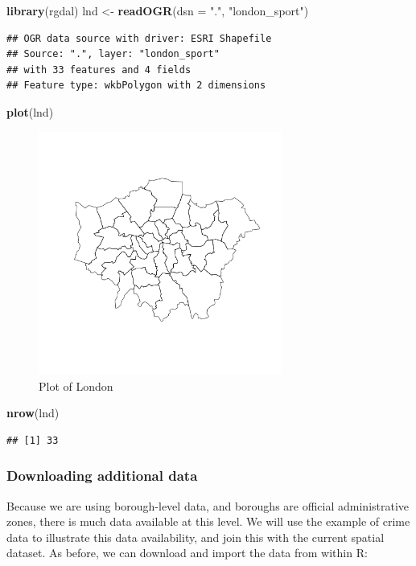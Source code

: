 \documentclass[]{article}
\newenvironment{Shaded}{}{}
\newcommand{\KeywordTok}[1]{\textcolor[rgb]{0.00,0.44,0.13}{\textbf{{#1}}}}
\newcommand{\DataTypeTok}[1]{\textcolor[rgb]{0.56,0.13,0.00}{{#1}}}
\newcommand{\StringTok}[1]{\textcolor[rgb]{0.25,0.44,0.63}{{#1}}}
\newcommand{\NormalTok}[1]{{#1}}
\begin{document}
\begin{Shaded}
\begin{Highlighting}[]
\KeywordTok{library}\NormalTok{(rgdal)}
\NormalTok{lnd <- }\KeywordTok{readOGR}\NormalTok{(}\DataTypeTok{dsn =} \StringTok{"."}\NormalTok{, }\StringTok{"london_sport"}\NormalTok{)}
\end{Highlighting}
\end{Shaded}
\begin{verbatim}
## OGR data source with driver: ESRI Shapefile 
## Source: ".", layer: "london_sport"
## with 33 features and 4 fields
## Feature type: wkbPolygon with 2 dimensions
\end{verbatim}
\begin{Shaded}
\begin{Highlighting}[]
\KeywordTok{plot}\NormalTok{(lnd)}
\end{Highlighting}
\end{Shaded}
\begin{figure}[htbp]
\centering
\includegraphics[width=8cm]{figure/Plot_of_London.png}
\caption{Plot of London}
\end{figure}

\begin{Shaded}
\begin{Highlighting}[]
\KeywordTok{nrow}\NormalTok{(lnd)}
\end{Highlighting}
\end{Shaded}
\begin{verbatim}
## [1] 33
\end{verbatim}
\subsubsection{Downloading additional data}

Because we are using borough-level data, and boroughs are official
administrative zones, there is much data available at this level. We
will use the example of crime data to illustrate this data availability,
and join this with the current spatial dataset. As before, we can
download and import the data from within R:
\end{document}

